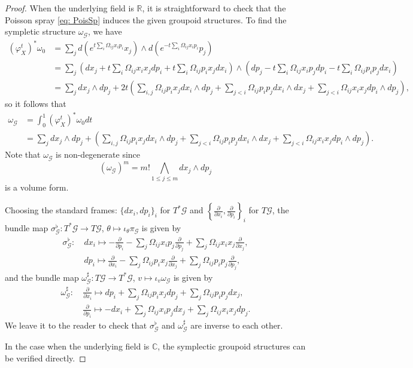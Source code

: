 \documentclass{amsart}
\numberwithin{equation}{section}
\newcommand{\cG}{\mathcal{G}}
\newcommand{\CC}{\mathbb{C}}
\newcommand{\RR}{\mathbb{R}}
\begin{document}
\begin{proof}
  When the underlying field is $\RR$, it is straightforward to check that the Poisson spray \eqref{eq: PoisSp} induces the given groupoid structures. To find the sympletic structure $\omega_\cG$, we have
  \begin{align*}
    \left(\varphi_X^t\right)^*\omega_0 & = \sum_{j} d \left(e^{t \sum_{i} \Omega_{ij} x_ip_i}x_j \right) \wedge d \left(e^{-t \sum_{i} \Omega_{ij} x_ip_i}p_j \right) \\
    & = \sum_{j} \left(d x_j + t \sum_{i} \Omega_{ij} x_i x_j dp_i + t \sum_{i} \Omega_{ij} p_i x_j dx_i \right) \wedge \left(d p_j - t \sum_{i} \Omega_{ij} x_i p_j dp_i - t \sum_{i} \Omega_{ij} p_i p_j dx_i \right) \\
    & = \sum_{j} dx_j \wedge dp_j + 2t \left( \sum_{i, j} \Omega_{ij}p_i x_j d x_i \wedge d p_j  + \sum_{j < i} \Omega_{ij}p_ip_j d x_i \wedge d x_j + \sum_{j < i} \Omega_{ij}x_ix_j d p_i \wedge d p_j \right),
  \end{align*}
  so it follows that
  \begin{align*}
    \omega_\cG & = \int_{0}^{1} (\varphi_X^t)^*\omega_0 dt \\
    & = \sum_{j} dx_j \wedge dp_j
      + \left(
	\sum_{i, j} \Omega_{ij}p_ix_j dx_i \wedge dp_j 
	+ \sum_{j < i} \Omega_{ij}p_ip_j dx_i \wedge dx_j
	+ \sum_{j < i} \Omega_{ij}x_ix_j dp_i \wedge dp_j
      \right).
  \end{align*}
  Note that $\omega_\cG$ is non-degenerate since
  \[(\omega_\cG)^m = m! \bigwedge\limits_{1\leq j\leq m} dx_j \wedge dp_j\]
  is a volume form.

  Choosing the standard frames: $\{dx_i, dp_i\}_i$ for $T^*\cG$ and $\left\{\frac{\partial}{\partial x_i}, \frac{\partial}{\partial p_i}\right\}_i$ for $T\cG$, the bundle map $\sigma_\cG^\flat: T^*\cG \to T\cG$, $\theta \mapsto \iota_\theta \pi_\cG$ is given by
  \begin{align*}
    \sigma_\cG^\flat: &~ dx_i \mapsto -\frac{\partial}{\partial p_i} - \sum_{j} \Omega_{ij} x_i p_j \frac{\partial}{\partial p_j}+ \sum_{j} \Omega_{ij} x_i x_j \frac{\partial}{\partial x_j}, \\
    &~ dp_i \mapsto \frac{\partial}{\partial x_i} - \sum_{j} \Omega_{ij} p_i x_j \frac{\partial}{\partial x_j}+ \sum_{j} \Omega_{ij} p_i p_j \frac{\partial}{\partial p_j},
  \end{align*}
  and the bundle map $\omega_\cG^\sharp: T\cG \to T^*\cG$, $v \mapsto \iota_v \omega_\cG$ is given by
  \begin{align*}
    \omega_\cG^\sharp: &~ \frac{\partial}{\partial x_i} \mapsto dp_i + \sum_{j} \Omega_{ij} p_i x_j dp_j + \sum_{j} \Omega_{ij} p_i p_j dx_j, \\
    &~ \frac{\partial}{\partial p_i} \mapsto -dx_i + \sum_{j} \Omega_{ij} x_i p_j dx_j + \sum_{j} \Omega_{ij} x_i x_j dp_j.
  \end{align*}
  We leave it to the reader to check that $\sigma_\cG^\flat$ and $\omega_\cG^\sharp$ are inverse to each other.

  In the case when the underlying field is $\CC$, the symplectic groupoid structures can be verified directly.
\end{proof}
\end{document}
